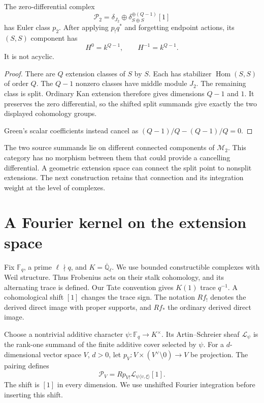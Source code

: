 \begin{proposition}\label{v4-arith:hall:prop:virtual}
The zero-differential complex
\[
 \mathscr P_2=\delta_{J_2}
       \oplus\delta_{S\oplus S}^{\oplus(Q-1)}[1]
\]
has Euler class $p_2$. After applying $p_!q^*$ and forgetting
endpoint actions, its $(S,S)$ component has
\[
 H^0=k^{Q-1},\qquad H^{-1}=k^{Q-1}.
\]
It is not acyclic.
\end{proposition}
\begin{proof}
There are $Q$ extension classes of $S$ by $S$.
Each has stabilizer $\operatorname{Hom}(S,S)$ of order $Q$.
The $Q-1$ nonzero classes have middle module $J_2$. The remaining
class is split. Ordinary Kan extension therefore gives dimensions
$Q-1$ and $1$. It preserves the zero differential, so the shifted
split summands give exactly the two displayed cohomology groups.


Green's scalar coefficients instead cancel as
$(Q-1)/Q-(Q-1)/Q=0$.
\end{proof}

The two source summands lie on different connected components of
$\mathcal M_2$. This category has no morphism between them that
could provide a cancelling differential. A geometric extension
space can connect the split point to nonsplit extensions.
The next construction retains that connection and its integration
weight at the level of complexes.

\section{A Fourier kernel on the extension space}
\label{v4-arith:hall:sec:fourier}

Fix $\mathbb F_q$, a prime $\ell\nmid q$, and
$K=\overline{\mathbb Q}_\ell$.
We use bounded constructible complexes with Weil structure.
Thus Frobenius acts on their stalk cohomology, and its alternating
trace is defined. Our Tate convention gives $K(1)$ trace $q^{-1}$.
A cohomological shift $[1]$ changes the trace sign.
The notation $Rf_!$ denotes the derived direct image with proper
supports, and $Rf_*$ the ordinary derived direct image.

Choose a nontrivial additive character
$\psi:\mathbb F_q\to K^\times$. Its Artin--Schreier sheaf
$\mathcal L_\psi$ is the rank-one summand of the finite additive
cover selected by $\psi$. For a $d$-dimensional vector space
$V$, $d>0$, let $p_V:V\times(V^\vee\setminus0)\to V$ be projection.
The pairing defines
\begin{equation}\label{v4-arith:hall:eq:fourier-kernel}
 \mathcal P_V
 =Rp_{V!}\mathcal L_{\psi\langle v,\xi\rangle}[1].
\end{equation}
The shift is $[1]$ in every dimension. We use unshifted Fourier
integration before inserting this shift.

